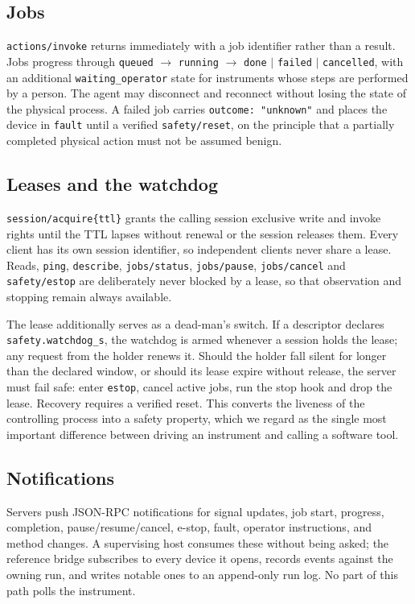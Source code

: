 \documentclass[11pt]{article}
\begin{document}
\subsection{Jobs}


\texttt{actions/invoke} returns immediately with a job identifier rather than a result. Jobs
progress through \texttt{queued} $\rightarrow$ \texttt{running} $\rightarrow$
\texttt{done} $\mid$ \texttt{failed} $\mid$ \texttt{cancelled}, with an additional
\texttt{waiting\_operator} state for instruments whose steps are performed by a person. The
agent may disconnect and reconnect without losing the state of the physical process. A failed
job carries \texttt{outcome:\ "unknown"} and places the device in \texttt{fault} until a
verified \texttt{safety/reset}, on the principle that a partially completed physical action
must not be assumed benign.

\subsection{Leases and the watchdog}


\texttt{session/acquire\{ttl\}} grants the calling session exclusive write and invoke rights
until the TTL lapses without renewal or the session releases them. Every client has its own
session identifier, so independent clients never share a lease. Reads, \texttt{ping},
\texttt{describe}, \texttt{jobs/status}, \texttt{jobs/pause}, \texttt{jobs/cancel} and
\texttt{safety/estop} are deliberately never blocked by a lease, so that observation and
stopping remain always available.

The lease additionally serves as a dead-man's switch. If a descriptor declares
\texttt{safety.watchdog\_s}, the watchdog is armed whenever a session holds the lease; any
request from the holder renews it. Should the holder fall silent for longer than the declared
window, or should its lease expire without release, the server must fail safe: enter
\texttt{estop}, cancel active jobs, run the stop hook and drop the lease. Recovery requires a
verified reset. This converts the liveness of the controlling process into a safety property,
which we regard as the single most important difference between driving an instrument and
calling a software tool.

\subsection{Notifications}
Servers push JSON-RPC notifications for signal updates, job start, progress, completion,
pause/resume/cancel, e-stop, fault, operator instructions, and method changes. A supervising
host consumes these without being asked; the reference bridge subscribes to every device it
opens, records events against the owning run, and writes notable ones to an append-only run
log. No part of this path polls the instrument.
\end{document}

